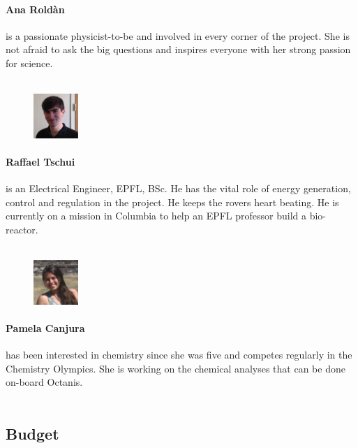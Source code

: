 \documentclass[a4paper,12pt]{article}
\begin{document}
\paragraph{Ana Roldàn} is a passionate physicist-to-be and involved in every corner of the project. She is not afraid to ask the big questions and inspires everyone with her strong passion for science.
\\ \\

\begin{figure}
     \centering
     \vspace{-13pt}
    \includegraphics[width=0.15\textwidth]{raf}
\end{figure} 
\paragraph{Raffael Tschui} is an Electrical Engineer, EPFL, BSc. He has the vital role of energy generation, control and regulation in the project. He keeps the rovers heart beating. He is currently on a mission in Columbia to help an EPFL professor build a bio-reactor.
\\ \\

\begin{figure}
    \centering
    \vspace{-13pt}
    \includegraphics[width=0.15\textwidth]{pam}
\end{figure} 
\paragraph{Pamela Canjura} has been interested in chemistry since she was five and competes regularly in the Chemistry Olympics. She is working on the chemical analyses that can be done on-board Octanis.
\\ \\


\subsection{Budget}
\end{document}
